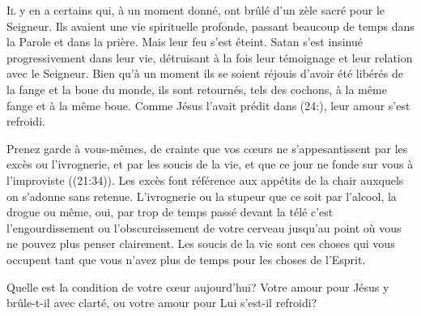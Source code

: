 \dvrule








\lettrine{I}{l} y en a certains qui, à un moment donné,
 ont brûlé d'un zèle sacré pour le Seigneur.
 Ils avaient une vie spirituelle profonde, passant beaucoup de temps
 dans la Parole et dans la prière. Mais leur feu s'est éteint.
 Satan s'est insinué progressivement dans leur vie, détruisant à la fois
 leur témoignage et leur relation avec le Seigneur.
 Bien qu'à un moment ils se soient réjouis d'avoir été libérés
 de la fange et la boue du monde, ils sont retournés, tels des cochons,
 à la même fange et à la même boue.
 Comme Jésus l'avait prédit dans (24:),
 leur amour s'est refroidi. 


\Og Prenez garde à vous-mêmes, de crainte que vos c\oe{}urs
 ne s'appesantissent par les excès ou l'ivrognerie,
 et par les soucis de la vie, et que ce jour ne fonde sur vous
 à l'improviste \Fg{} ((21:34)).
 Les excès font référence aux appétits de la chair auxquels
 on s'adonne sans retenue. L'ivrognerie ou la stupeur
 \ocadr que ce soit par l'alcool, la drogue ou même, oui,
 par trop de temps passé devant la télé \fcadr{} c'est l'engourdissement
 ou l'obscurcissement de votre cerveau jusqu'au point
 où vous ne pouvez plus penser clairement.
 Les soucis de la vie sont ces choses qui vous occupent
 tant que vous n'avez plus de temps pour les choses de l'Esprit. 

Quelle est la condition de votre c\oe{}ur aujourd'hui?
 Votre amour pour Jésus y brûle-t-il avec clarté,
 ou votre amour pour Lui s'est-il refroidi? 

\dvrule



